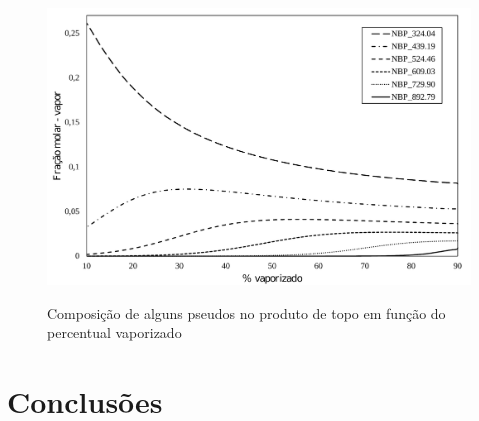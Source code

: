 \begin{figure}[htb]
\centering
{\includegraphics[width=1.0\textwidth]{img/trab3vapall.pdf}} 
\caption{Composição de alguns pseudos no produto de topo em função do
percentual vaporizado}
\label{fig:vapall}
\end{figure}

\clearpage
\section{Conclusões}  

